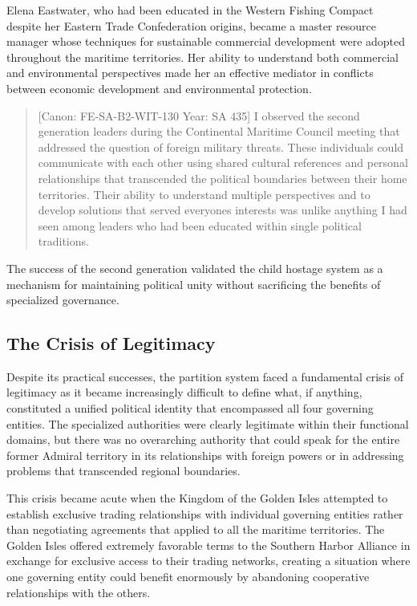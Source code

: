 Elena Eastwater, who had been educated in the Western Fishing Compact
despite her Eastern Trade Confederation origins, became a master
resource manager whose techniques for sustainable commercial development
were adopted throughout the maritime territories. Her ability to
understand both commercial and environmental perspectives made her an
effective mediator in conflicts between economic development and
environmental protection.

\begin{quote}
{[}Canon: FE-SA-B2-WIT-130 \textbar{} Year: SA 435{]} I observed the
second generation leaders during the Continental Maritime Council
meeting that addressed the question of foreign military threats. These
individuals could communicate with each other using shared cultural
references and personal relationships that transcended the political
boundaries between their home territories. Their ability to understand
multiple perspectives and to develop solutions that served
everyone\textquotesingle s interests was unlike anything I had seen
among leaders who had been educated within single political traditions.
\end{quote}

The success of the second generation validated the child hostage system
as a mechanism for maintaining political unity without sacrificing the
benefits of specialized governance.

\subsection{The Crisis of Legitimacy}\label{the-crisis-of-legitimacy}

Despite its practical successes, the partition system faced a
fundamental crisis of legitimacy as it became increasingly difficult to
define what, if anything, constituted a unified political identity that
encompassed all four governing entities. The specialized authorities
were clearly legitimate within their functional domains, but there was
no overarching authority that could speak for the entire former Admiral
territory in its relationships with foreign powers or in addressing
problems that transcended regional boundaries.

This crisis became acute when the Kingdom of the Golden Isles attempted
to establish exclusive trading relationships with individual governing
entities rather than negotiating agreements that applied to all the
maritime territories. The Golden Isles offered extremely favorable terms
to the Southern Harbor Alliance in exchange for exclusive access to
their trading networks, creating a situation where one governing entity
could benefit enormously by abandoning cooperative relationships with
the others.

